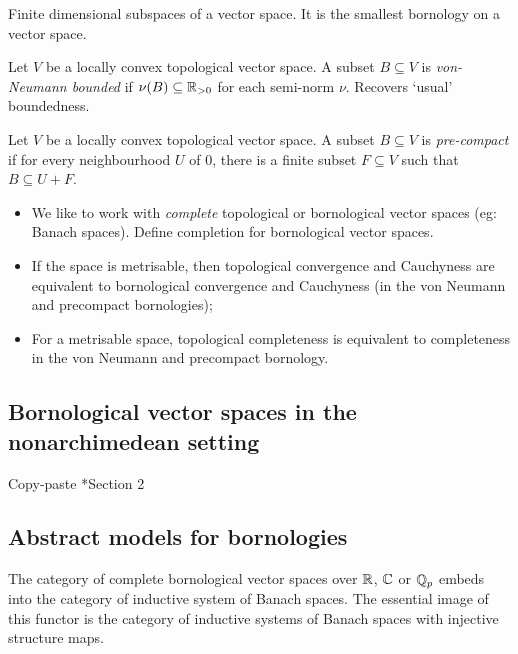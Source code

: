\begin{example}
Finite dimensional subspaces of a vector space. It is the smallest bornology on a vector space.
\end{example}

\begin{example}
Let \(V\) be a locally convex topological vector space. A subset \(B\subseteq V\) is \textit{von-Neumann bounded} if \(\nu(B) \subseteq \mathbb R_{>0}\) for each semi-norm \(\nu\). Recovers `usual' boundedness.  
\end{example}

\begin{example}
Let \(V\) be a locally convex topological vector space. A subset \(B \subseteq V\) is \textit{pre-compact} if for every neighbourhood \(U\) of \(0\), there is a finite subset \(F \subseteq V\) such that \(B \subseteq U + F\).  
\end{example}



\begin{itemize}
\item We like to work with \textit{complete} topological or bornological vector spaces (eg: Banach spaces). Define completion for bornological vector spaces.
\item If the space is metrisable, then topological convergence and Cauchyness are equivalent to bornological convergence and Cauchyness (in the von Neumann and precompact bornologies);
\item For a metrisable space, topological completeness is equivalent to completeness in the von Neumann and precompact bornology.

\end{itemize}



\subsection{Bornological vector spaces in the nonarchimedean setting}


Copy-paste \cite{Cortinas-Cuntz-Meyer-Tamme:Nonarchimedean}*{Section 2}


\subsection{Abstract models for bornologies}


\begin{theorem}
The category of complete bornological vector spaces over \(\mathbb R\), \(\mathbb C\) or \(\mathbb Q_p\) embeds into the category of inductive system of Banach spaces. The essential image of this functor is the category of inductive systems of Banach spaces with injective structure maps.
\end{theorem}

